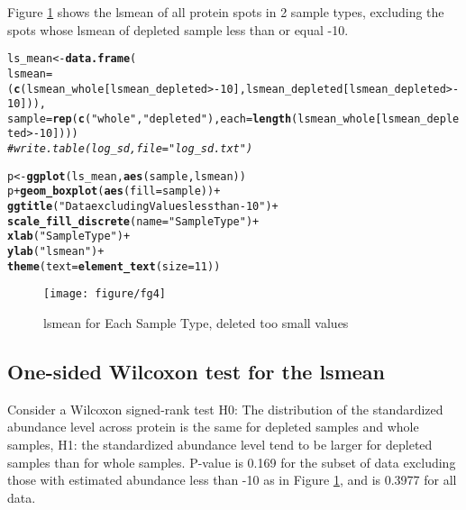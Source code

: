 \documentclass{article}\usepackage[]{graphicx}\usepackage[]{color}
\makeatletter
\def\maxwidth{ %
  \ifdim\Gin@nat@width>\linewidth
    \linewidth
  \else
    \Gin@nat@width
  \fi
}
\newcommand{\hlnum}[1]{\textcolor[rgb]{0.686,0.059,0.569}{#1}}%
\newcommand{\hlstr}[1]{\textcolor[rgb]{0.192,0.494,0.8}{#1}}%
\newcommand{\hlcom}[1]{\textcolor[rgb]{0.678,0.584,0.686}{\textit{#1}}}%
\newcommand{\hlopt}[1]{\textcolor[rgb]{0,0,0}{#1}}%
\newcommand{\hlstd}[1]{\textcolor[rgb]{0.345,0.345,0.345}{#1}}%
\newcommand{\hlkwb}[1]{\textcolor[rgb]{0.69,0.353,0.396}{#1}}%
\newcommand{\hlkwc}[1]{\textcolor[rgb]{0.333,0.667,0.333}{#1}}%
\newcommand{\hlkwd}[1]{\textcolor[rgb]{0.737,0.353,0.396}{\textbf{#1}}}%
\newenvironment{kframe}{%
 \def\at@end@of@kframe{}%
 \ifinner\ifhmode%
  \def\at@end@of@kframe{\end{minipage}}%
  \begin{minipage}{\columnwidth}%
 \fi\fi%
 \def\FrameCommand##1{\hskip\@totalleftmargin \hskip-\fboxsep
 \colorbox{shadecolor}{##1}\hskip-\fboxsep
     \hskip-\linewidth \hskip-\@totalleftmargin \hskip\columnwidth}%
 \MakeFramed {\advance\hsize-\width
   \@totalleftmargin\z@ \linewidth\hsize
   \@setminipage}}%
 {\par\unskip\endMakeFramed%
 \at@end@of@kframe}
\newenvironment{knitrout}{}{} %
\makeatother
\begin{document}
Figure \ref{fig:fg4} shows the  lsmean of all protein spots in 2 sample types, excluding the spots whose lsmean of depleted sample less than or equal -10.
\begin{knitrout}
\color{fgcolor}\begin{kframe}
\begin{alltt}
\hlstd{ls_mean} \hlkwb{<-} \hlkwd{data.frame}\hlstd{(}
  \hlkwc{lsmean} \hlstd{= (}\hlkwd{c}\hlstd{(lsmean_whole[lsmean_depleted} \hlopt{>-}\hlnum{10}\hlstd{], lsmean_depleted[lsmean_depleted} \hlopt{>-}\hlnum{10}\hlstd{])),}
  \hlkwc{sample} \hlstd{=} \hlkwd{rep}\hlstd{(}\hlkwd{c}\hlstd{(}\hlstr{"whole"}\hlstd{,} \hlstr{"depleted"}\hlstd{),} \hlkwc{each} \hlstd{=} \hlkwd{length}\hlstd{(lsmean_whole[lsmean_depleted} \hlopt{>-}\hlnum{10}\hlstd{])))}
\hlcom{# write.table(log_sd, file = "log_sd.txt")}

\hlstd{p} \hlkwb{<-} \hlkwd{ggplot}\hlstd{(ls_mean,} \hlkwd{aes}\hlstd{(sample, lsmean))}
\hlstd{p} \hlopt{+} \hlkwd{geom_boxplot}\hlstd{(}\hlkwd{aes}\hlstd{(}\hlkwc{fill} \hlstd{= sample))} \hlopt{+}
  \hlkwd{ggtitle}\hlstd{(}\hlstr{"Data excluding Values less than -10"}\hlstd{)} \hlopt{+}
  \hlkwd{scale_fill_discrete}\hlstd{(}\hlkwc{name}\hlstd{=} \hlstr{"Sample Type"}\hlstd{)} \hlopt{+}
  \hlkwd{xlab}\hlstd{(}\hlstr{"Sample Type"}\hlstd{)} \hlopt{+}
  \hlkwd{ylab}\hlstd{(}\hlstr{"lsmean"}\hlstd{)} \hlopt{+}
  \hlkwd{theme}\hlstd{(}\hlkwc{text} \hlstd{=} \hlkwd{element_text}\hlstd{(}\hlkwc{size}\hlstd{=}\hlnum{11}\hlstd{))}
\end{alltt}
\end{kframe}\begin{figure}[H]

\texttt{[image: figure/fg4]} \caption[lsmean for Each Sample Type, deleted too small values]{lsmean for Each Sample Type, deleted too small values\label{fig:fg4}}
\end{figure}


\end{knitrout}




\subsection{One-sided Wilcoxon test for the lsmean}
Consider a Wilcoxon signed-rank test H0: The distribution of the  standardized abundance level across protein   is the same for  depleted samples and whole samples, H1: the standardized abundance level tend to be larger for depleted samples than for whole samples. P-value is 0.169 for the subset of data excluding those with estimated abundance less than -10 as in Figure \ref{fig:fg4}, and is 0.3977 for all data.
\end{document}
